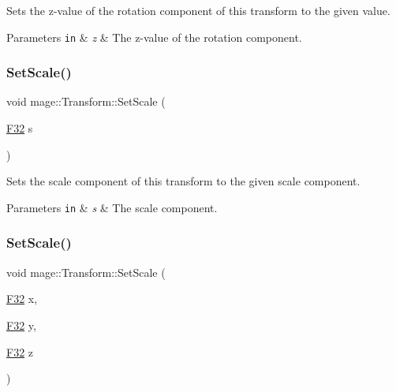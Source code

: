 Sets the z-\/value of the rotation component of this transform to the given value.


\begin{DoxyParams}[1]{Parameters}
\mbox{\tt in}  & {\em z} & The z-\/value of the rotation component. \\
\hline
\end{DoxyParams}
\mbox{\label{classmage_1_1_transform_acf366489ae37e771e3f7b06c6452cb33}} 
\subsubsection{\texorpdfstring{Set\+Scale()}{SetScale()}\hspace{0.1cm}{\footnotesize\ttfamily [1/4]}}
{\footnotesize\ttfamily void mage\+::\+Transform\+::\+Set\+Scale (\begin{DoxyParamCaption}\item[{\mbox{\hyperlink{namespacemage_aa97e833b45f06d60a0a9c4fc22ae02c0}{F32}}}]{s }\end{DoxyParamCaption})\hspace{0.3cm}{\ttfamily [noexcept]}}

Sets the scale component of this transform to the given scale component.


\begin{DoxyParams}[1]{Parameters}
\mbox{\tt in}  & {\em s} & The scale component. \\
\hline
\end{DoxyParams}
\mbox{\label{classmage_1_1_transform_a0a2d5430c745a27c5acaff472ba8b82e}} 
\subsubsection{\texorpdfstring{Set\+Scale()}{SetScale()}\hspace{0.1cm}{\footnotesize\ttfamily [2/4]}}
{\footnotesize\ttfamily void mage\+::\+Transform\+::\+Set\+Scale (\begin{DoxyParamCaption}\item[{\mbox{\hyperlink{namespacemage_aa97e833b45f06d60a0a9c4fc22ae02c0}{F32}}}]{x,  }\item[{\mbox{\hyperlink{namespacemage_aa97e833b45f06d60a0a9c4fc22ae02c0}{F32}}}]{y,  }\item[{\mbox{\hyperlink{namespacemage_aa97e833b45f06d60a0a9c4fc22ae02c0}{F32}}}]{z }\end{DoxyParamCaption})\hspace{0.3cm}{\ttfamily [noexcept]}}

